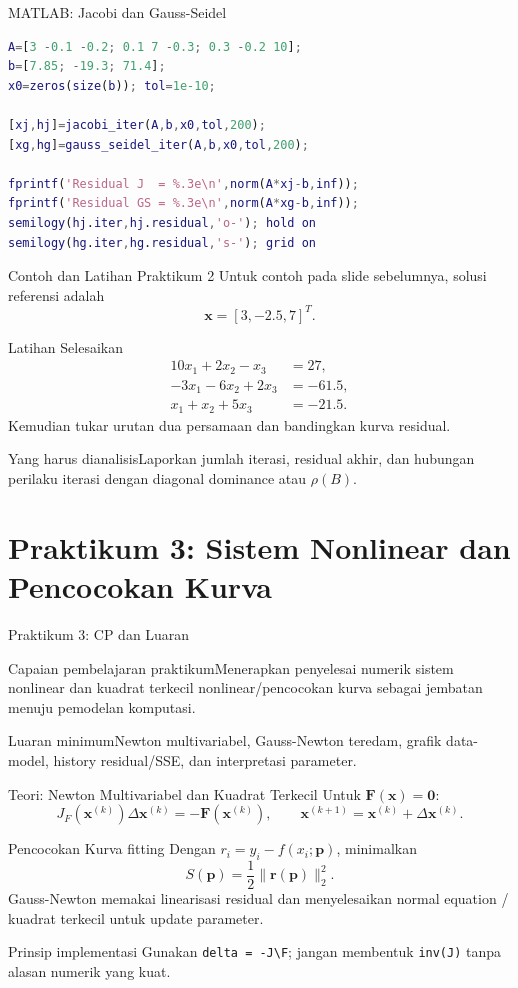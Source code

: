 \documentclass[slides,english,noindex,lean,nobackpage,nocopyright,noupdate,nosummary]{enacom}
\newcommand{\CPBox}[1]{\begin{block}{Capaian pembelajaran praktikum}#1\end{block}}
\newcommand{\OutBox}[1]{\begin{exampleblock}{Luaran minimum}#1\end{exampleblock}}
\newcommand{\AnalysisBox}[1]{\begin{alertblock}{Yang harus dianalisis}#1\end{alertblock}}
\begin{document}
\begin{frame}{MATLAB: Jacobi dan Gauss-Seidel}
\begin{lstlisting}[language=Matlab]
A=[3 -0.1 -0.2; 0.1 7 -0.3; 0.3 -0.2 10];
b=[7.85; -19.3; 71.4];
x0=zeros(size(b)); tol=1e-10;

[xj,hj]=jacobi_iter(A,b,x0,tol,200);
[xg,hg]=gauss_seidel_iter(A,b,x0,tol,200);

fprintf('Residual J  = %.3e\n',norm(A*xj-b,inf));
fprintf('Residual GS = %.3e\n',norm(A*xg-b,inf));
semilogy(hj.iter,hj.residual,'o-'); hold on
semilogy(hg.iter,hg.residual,'s-'); grid on
\end{lstlisting}
\end{frame}

\begin{frame}{Contoh dan Latihan Praktikum 2}
Untuk contoh pada slide sebelumnya, solusi referensi adalah
\[
\mathbf{x}=[3,-2.5,7]^T.
\]
\begin{exampleblock}{Latihan}
Selesaikan
\[
\begin{aligned}
10x_1+2x_2-x_3&=27,\\
-3x_1-6x_2+2x_3&=-61.5,\\
x_1+x_2+5x_3&=-21.5.
\end{aligned}
\]
Kemudian tukar urutan dua persamaan dan bandingkan kurva residual.
\end{exampleblock}
\AnalysisBox{Laporkan jumlah iterasi, residual akhir, dan hubungan perilaku iterasi dengan diagonal dominance atau $\rho(B)$.}
\end{frame}

\section{Praktikum 3: Sistem Nonlinear dan Pencocokan Kurva}

\begin{frame}{Praktikum 3: CP dan Luaran}
\CPBox{Menerapkan penyelesai numerik sistem nonlinear dan kuadrat terkecil nonlinear/pencocokan kurva sebagai jembatan menuju pemodelan komputasi.}
\OutBox{Newton multivariabel, Gauss-Newton teredam, grafik data-model, history residual/SSE, dan interpretasi parameter.}
\end{frame}

\begin{frame}{Teori: Newton Multivariabel dan Kuadrat Terkecil}
Untuk $\mathbf{F}(\mathbf{x})=\mathbf{0}$:
\[
J_F(\mathbf{x}^{(k)})\Delta\mathbf{x}^{(k)}=-\mathbf{F}(\mathbf{x}^{(k)}),\qquad
\mathbf{x}^{(k+1)}=\mathbf{x}^{(k)}+\Delta\mathbf{x}^{(k)}.
\]
\begin{block}{Pencocokan Kurva fitting}
Dengan $r_i=y_i-f(x_i;\mathbf{p})$, minimalkan
\[
S(\mathbf{p})=\frac12\|\mathbf{r}(\mathbf{p})\|_2^2.
\]
Gauss-Newton memakai linearisasi residual dan menyelesaikan normal equation / kuadrat terkecil untuk update parameter.
\end{block}
\begin{alertblock}{Prinsip implementasi}
Gunakan \texttt{delta = -J\textbackslash F}; jangan membentuk \texttt{inv(J)} tanpa alasan numerik yang kuat.
\end{alertblock}
\end{frame}
\end{document}
